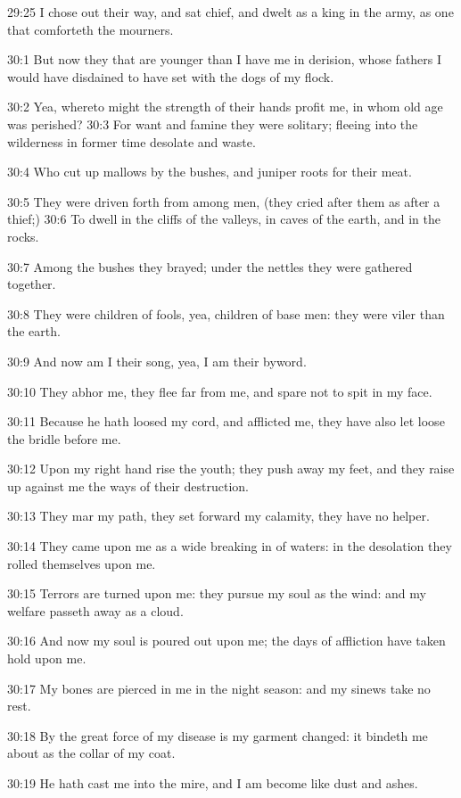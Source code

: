 29:25 I chose out their way, and sat chief, and dwelt as a king in the army, as one that comforteth the mourners.

30:1 But now they that are younger than I have me in derision, whose fathers I would have disdained to have set with the dogs of my flock.

30:2 Yea, whereto might the strength of their hands profit me, in whom old age was perished?  30:3 For want and famine they were solitary; fleeing into the wilderness in former time desolate and waste.

30:4 Who cut up mallows by the bushes, and juniper roots for their meat.

30:5 They were driven forth from among men, (they cried after them as after a thief;) 30:6 To dwell in the cliffs of the valleys, in caves of the earth, and in the rocks.

30:7 Among the bushes they brayed; under the nettles they were gathered together.

30:8 They were children of fools, yea, children of base men: they were viler than the earth.

30:9 And now am I their song, yea, I am their byword.

30:10 They abhor me, they flee far from me, and spare not to spit in my face.

30:11 Because he hath loosed my cord, and afflicted me, they have also let loose the bridle before me.

30:12 Upon my right hand rise the youth; they push away my feet, and they raise up against me the ways of their destruction.

30:13 They mar my path, they set forward my calamity, they have no helper.

30:14 They came upon me as a wide breaking in of waters: in the desolation they rolled themselves upon me.

30:15 Terrors are turned upon me: they pursue my soul as the wind: and my welfare passeth away as a cloud.

30:16 And now my soul is poured out upon me; the days of affliction have taken hold upon me.

30:17 My bones are pierced in me in the night season: and my sinews take no rest.

30:18 By the great force of my disease is my garment changed: it bindeth me about as the collar of my coat.

30:19 He hath cast me into the mire, and I am become like dust and ashes.

